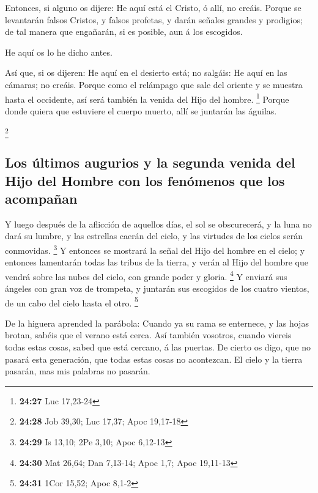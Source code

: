  Entonces, si alguno os dijere: He aquí está el Cristo, ó
allí, no creáis.  Porque se levantarán falsos Cristos, y
falsos profetas, y darán señales grandes y prodigios; de tal manera que
engañarán, si es posible, aun á los escogidos.

 He aquí os lo he dicho antes.

 Así que, si os dijeren: He aquí en el desierto está; no
salgáis: He aquí en las cámaras; no creáis.  Porque como el
relámpago que sale del oriente y se muestra hasta el occidente, así será
también la venida del Hijo del hombre. \footnote{\textbf{24:27} Luc
  17,23-24}  Porque donde quiera que estuviere el cuerpo
muerto, allí se juntarán las águilas.

\footnote{\textbf{24:28} Job 39,30; Luc 17,37; Apoc 19,17-18}

\hypertarget{los-uxfaltimos-augurios-y-la-segunda-venida-del-hijo-del-hombre-con-los-fenuxf3menos-que-los-acompauxf1an}{%
\subsection{Los últimos augurios y la segunda venida del Hijo del Hombre
con los fenómenos que los
acompañan}\label{los-uxfaltimos-augurios-y-la-segunda-venida-del-hijo-del-hombre-con-los-fenuxf3menos-que-los-acompauxf1an}}

 Y luego después de la aflicción de aquellos días, el sol
se obscurecerá, y la luna no dará su lumbre, y las estrellas caerán del
cielo, y las virtudes de los cielos serán conmovidas. \footnote{\textbf{24:29}
  Is 13,10; 2Pe 3,10; Apoc 6,12-13}  Y entonces se mostrará
la señal del Hijo del hombre en el cielo; y entonces lamentarán todas
las tribus de la tierra, y verán al Hijo del hombre que vendrá sobre las
nubes del cielo, con grande poder y gloria. \footnote{\textbf{24:30} Mat
  26,64; Dan 7,13-14; Apoc 1,7; Apoc 19,11-13}  Y enviará
sus ángeles con gran voz de trompeta, y juntarán sus escogidos de los
cuatro vientos, de un cabo del cielo hasta el otro. \footnote{\textbf{24:31}
  1Cor 15,52; Apoc 8,1-2}

 De la higuera aprended la parábola: Cuando ya su rama se
enternece, y las hojas brotan, sabéis que el verano está cerca.
 Así también vosotros, cuando viereis todas estas cosas,
sabed que está cercano, á las puertas.  De cierto os digo,
que no pasará esta generación, que todas estas cosas no acontezcan.
 El cielo y la tierra pasarán, mas mis palabras no pasarán.

